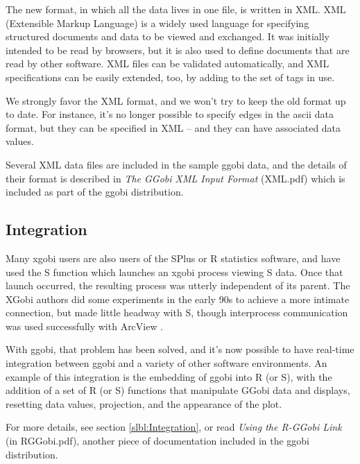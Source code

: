 \documentclass[11pt]{article}
\begin{document}
{The new format, in which all the data lives in one file, is written
in XML.  XML (Extensible Markup Language) is a widely used language
for specifying structured documents and data to be viewed and
exchanged.  It was initially intended to be read by browsers, but it
is also used to define documents that are read by other software.
XML files can be validated automatically, and XML specifications can
be easily extended, too, by adding to the set of tags in use.

We strongly favor the XML format, and we won't try to keep the
old format up to date.  For instance, it's no longer possible
to specify edges in the ascii data format, but they can be specified in
XML -- and they can have associated data values.

Several XML data files are included in the sample ggobi data, and
the details of their format is described in {\em The GGobi XML Input Format}
(XML.pdf) which is included as part of the ggobi distribution.

\subsection{Integration}

Many xgobi users are also users of the SPlus or R statistics software, and
have used the S function which launches an xgobi process viewing S data.
Once that launch occurred, the resulting process was utterly independent
of its parent.  The XGobi authors did some experiments in the early 90s
to achieve a more intimate connection, but made little headway with S,
though interprocess communication was used successfully with ArcView
\cite{SwayneBujaHubbell91,SMCM97}.

With ggobi, that problem has been solved, and it's now possible
to have real-time integration between ggobi and a variety of
other software environments.  An example of this integration is
the embedding of ggobi into R (or S), with the addition of a set of
R (or S) functions that manipulate GGobi data and displays,
resetting data values, projection, and the appearance of the plot.

For more details, see section \ref{slbl:Integration}, or read
{\em Using the R-GGobi Link} (in RGGobi.pdf), another piece of
documentation included in the ggobi distribution.

}
\end{document}
